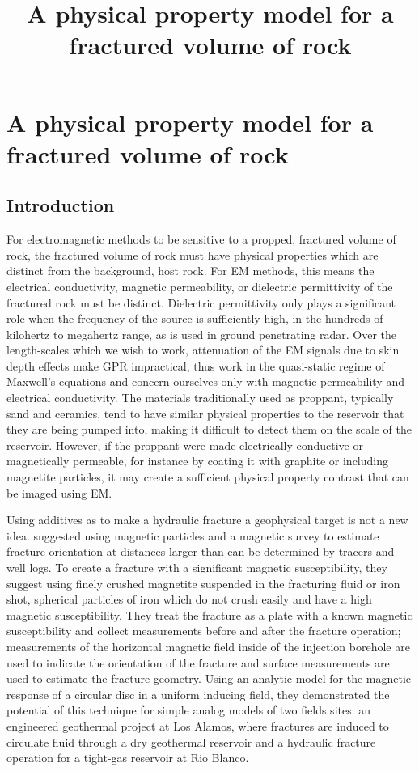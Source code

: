 
\chapter{A physical property model for a fractured volume of rock}
\label{ch:phys_prop_model}
\title{A physical property model for a fractured volume of rock}


\section{Introduction}

For electromagnetic methods to be sensitive to a propped, fractured volume of rock, the fractured volume of rock must have physical properties which are distinct from the background, host rock. For EM methods, this means the electrical conductivity, magnetic permeability, or dielectric permittivity of the fractured rock must be distinct. Dielectric permittivity only plays a significant role when the frequency of the source is sufficiently high, in the hundreds of kilohertz to megahertz range, as is used in ground penetrating radar. Over the length-scales which we wish to work, attenuation of the EM signals due to skin depth effects make GPR impractical, thus work in the quasi-static regime of Maxwell's equations and concern ourselves only with magnetic permeability and electrical conductivity. The materials traditionally used as proppant, typically sand and ceramics, tend to have similar physical properties to the reservoir that they are being pumped into, making it difficult to detect them on the scale of the reservoir. However, if the proppant were made electrically conductive or magnetically permeable, for instance by coating it with graphite or including magnetite particles, it may create a sufficient physical property contrast that can be imaged using EM.

Using additives as to make a hydraulic fracture a geophysical target is not a new idea. \cite{Byerlee1976} suggested using magnetic particles and a magnetic survey to estimate fracture orientation at distances larger than can be determined by tracers and well logs. To create a fracture with a significant magnetic susceptibility, they suggest using finely crushed magnetite suspended in the fracturing fluid or iron shot, spherical particles of iron which do not crush easily and have a high magnetic susceptibility. They treat the fracture as a plate with a known magnetic susceptibility and collect measurements before and after the fracture operation; measurements of the horizontal magnetic field inside of the injection borehole are used to indicate the orientation of the fracture and surface measurements are used to estimate the fracture geometry. Using an analytic model for the magnetic response of a circular disc in a uniform inducing field, they demonstrated the potential of this technique for simple analog models of two fields sites: an engineered geothermal project at Los Alamos, where fractures are induced to circulate fluid through a dry geothermal reservoir and a hydraulic fracture operation for a tight-gas reservoir at Rio Blanco.

